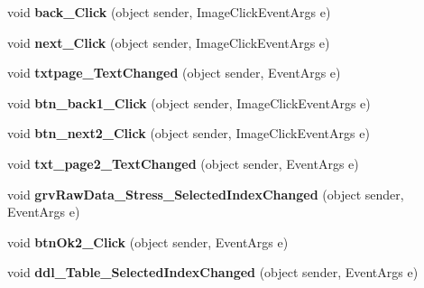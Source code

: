 \begin{DoxyCompactItemize}
\item 
\hypertarget{classusertrackothers__stress_aa96215c4fe36c43a5d98d192517bbd5f}{void {\bfseries back\-\_\-\-Click} (object sender, Image\-Click\-Event\-Args e)}\label{classusertrackothers__stress_aa96215c4fe36c43a5d98d192517bbd5f}

\item 
\hypertarget{classusertrackothers__stress_addd2f35b3a2ea850d1fe7620c67a81e6}{void {\bfseries next\-\_\-\-Click} (object sender, Image\-Click\-Event\-Args e)}\label{classusertrackothers__stress_addd2f35b3a2ea850d1fe7620c67a81e6}

\item 
\hypertarget{classusertrackothers__stress_a060d86d3221e7bafb08aea871e70c846}{void {\bfseries txtpage\-\_\-\-Text\-Changed} (object sender, Event\-Args e)}\label{classusertrackothers__stress_a060d86d3221e7bafb08aea871e70c846}

\item 
\hypertarget{classusertrackothers__stress_afe2eca035b220fbbf7daeda7dff1445e}{void {\bfseries btn\-\_\-back1\-\_\-\-Click} (object sender, Image\-Click\-Event\-Args e)}\label{classusertrackothers__stress_afe2eca035b220fbbf7daeda7dff1445e}

\item 
\hypertarget{classusertrackothers__stress_a9d59ba2b3f3593f230cedc206e4806cd}{void {\bfseries btn\-\_\-next2\-\_\-\-Click} (object sender, Image\-Click\-Event\-Args e)}\label{classusertrackothers__stress_a9d59ba2b3f3593f230cedc206e4806cd}

\item 
\hypertarget{classusertrackothers__stress_a83d08929a81f9773155d132ca8d4ef2d}{void {\bfseries txt\-\_\-page2\-\_\-\-Text\-Changed} (object sender, Event\-Args e)}\label{classusertrackothers__stress_a83d08929a81f9773155d132ca8d4ef2d}

\item 
\hypertarget{classusertrackothers__stress_a750da0deed0482c7b899d2bb62ef26eb}{void {\bfseries grv\-Raw\-Data\-\_\-\-Stress\-\_\-\-Selected\-Index\-Changed} (object sender, Event\-Args e)}\label{classusertrackothers__stress_a750da0deed0482c7b899d2bb62ef26eb}

\item 
\hypertarget{classusertrackothers__stress_ae7870456173aa393679779141148eef2}{void {\bfseries btn\-Ok2\-\_\-\-Click} (object sender, Event\-Args e)}\label{classusertrackothers__stress_ae7870456173aa393679779141148eef2}

\item 
\hypertarget{classusertrackothers__stress_added84bbae918794b1b9ee7a68346729}{void {\bfseries ddl\-\_\-\-Table\-\_\-\-Selected\-Index\-Changed} (object sender, Event\-Args e)}\label{classusertrackothers__stress_added84bbae918794b1b9ee7a68346729}


\end{DoxyCompactItemize}
